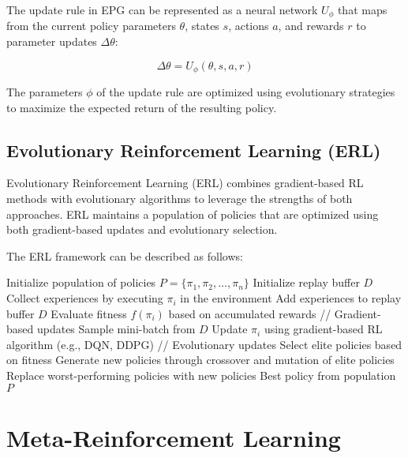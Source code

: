 \documentclass{article}
\begin{document}
The update rule in EPG can be represented as a neural network $U_\phi$ that maps from the current policy parameters $\theta$, states $s$, actions $a$, and rewards $r$ to parameter updates $\Delta \theta$:

\begin{equation}
\Delta \theta = U_\phi(\theta, s, a, r)
\end{equation}

The parameters $\phi$ of the update rule are optimized using evolutionary strategies to maximize the expected return of the resulting policy.

\subsection{Evolutionary Reinforcement Learning (ERL)}

Evolutionary Reinforcement Learning (ERL) combines gradient-based RL methods with evolutionary algorithms to leverage the strengths of both approaches. ERL maintains a population of policies that are optimized using both gradient-based updates and evolutionary selection.

The ERL framework can be described as follows:

\begin{algorithm}
\begin{algorithmic}[1]
\STATE Initialize population of policies $P = \{\pi_1, \pi_2, \ldots, \pi_n\}$
\STATE Initialize replay buffer $D$
        \STATE Collect experiences by executing $\pi_i$ in the environment
        \STATE Add experiences to replay buffer $D$
        \STATE Evaluate fitness $f(\pi_i)$ based on accumulated rewards
    \ENDFOR
    \STATE // Gradient-based updates
        \STATE Sample mini-batch from $D$
        \STATE Update $\pi_i$ using gradient-based RL algorithm (e.g., DQN, DDPG)
    \ENDFOR
    \STATE // Evolutionary updates
    \STATE Select elite policies based on fitness
    \STATE Generate new policies through crossover and mutation of elite policies
    \STATE Replace worst-performing policies with new policies
\ENDWHILE
\RETURN Best policy from population $P$
\end{algorithmic}
\end{algorithm}

\section{Meta-Reinforcement Learning}
\end{document}
